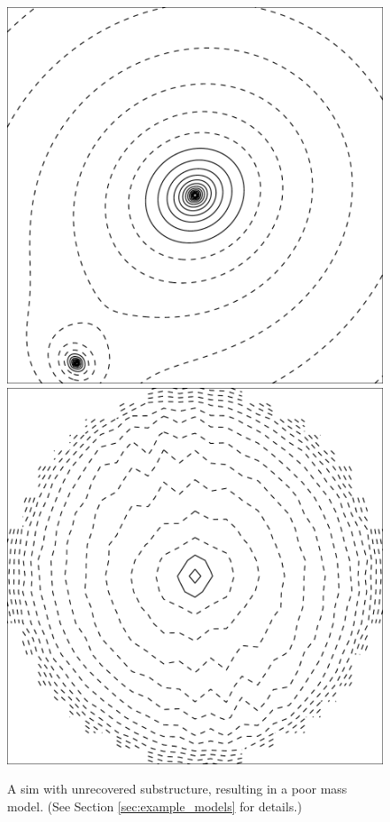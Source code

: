 \documentclass[usenatbib]{mn2e}
\newlength{\myplotswidth}
\begin{document}
\begin{figure}
  \includegraphics[width=\myplotswidth]{fig/ASW0000vqg_006937_kappa}
  \includegraphics[width=\myplotswidth]{fig/006937_mass}

  \caption[result 6937 (ASW0000vqg)]{A sim with unrecovered
    substructure, resulting in a poor mass model. (See Section
    \ref{sec:example_models} for details.)}
  \label{fig:6937}
\end{figure}
\end{document}

